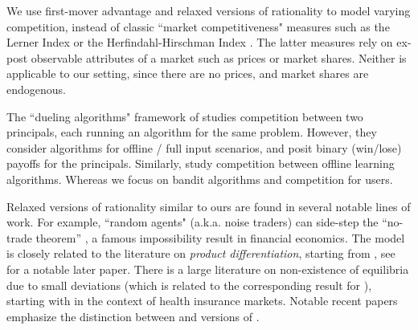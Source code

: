We use first-mover advantage and relaxed versions of rationality to model varying competition, instead of classic ``market competitiveness" measures such as the Lerner Index or the Herfindahl-Hirschman Index
\citep{tirole1988theory}. The latter measures rely on ex-post observable attributes of a market such as prices or market shares. Neither is applicable to our setting, since there are no prices, and market shares are endogenous. 

The ``dueling algorithms" framework of \citet{DuelingAlgs-stoc11} studies competition between two principals, each running an algorithm for the same problem. However, they consider algorithms for offline / full input scenarios, and posit binary (win/lose) payoffs for the principals. Similarly, \citet{ben2017best, ben2019regression} study competition between offline learning algorithms. Whereas we focus on bandit algorithms and competition for users.

Relaxed versions of rationality similar to ours are found in several notable lines of work. For example, ``random agents" (a.k.a. noise traders) can side-step the ``no-trade theorem'' \citep{Milgrom-Stokey-82}, a famous impossibility result in financial economics. The \SoftMaxRandom model is closely related to the literature on \emph{product differentiation}, starting from \cite{Hotelling-29}, see \cite{Perloff-Salop-85} for a notable later paper. There is a large literature on non-existence of equilibria due to small deviations   (which is related to the corresponding result for \HardMaxRandom), starting with \cite{Rothschild-Stiglitz-76} in the context of health insurance markets. Notable recent papers \citep{Veiga-Weyl-16,Azevedo-Gottlieb-17} emphasize the distinction between \HardMax and versions of \SoftMaxRandom.


